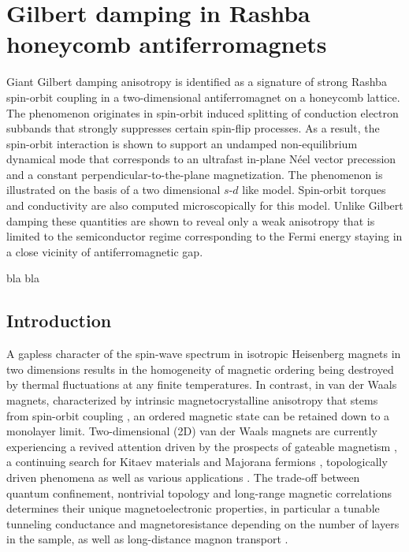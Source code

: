 \chapter{Gilbert damping in Rashba honeycomb antiferromagnets} %
Giant Gilbert damping anisotropy is identified as a signature of strong Rashba spin-orbit coupling in a two-dimensional antiferromagnet on a honeycomb lattice. The phenomenon originates in spin-orbit induced splitting of conduction electron subbands that strongly suppresses certain spin-flip processes. As a result, the spin-orbit interaction is shown to support an undamped non-equilibrium dynamical mode that corresponds to an ultrafast in-plane N\'eel vector precession and a constant perpendicular-to-the-plane magnetization. The phenomenon is illustrated on the basis of a two dimensional $s$-$d$ like model. Spin-orbit torques and conductivity are also computed microscopically for this model. Unlike Gilbert damping these quantities are shown to reveal only a weak anisotropy that is limited to the semiconductor regime corresponding to the Fermi energy staying in a close vicinity of antiferromagnetic gap.

\vfill
bla bla
\clearpage

\section{Introduction}

A gapless character of the spin-wave spectrum in isotropic Heisenberg magnets in two dimensions results in the homogeneity of magnetic ordering being destroyed by thermal fluctuations at any finite temperatures. In contrast, in van der Waals magnets, characterized by intrinsic magnetocrystalline anisotropy that stems from spin-orbit coupling \cite{Lado2017}, an ordered magnetic state can be retained down to a monolayer limit. Two-dimensional (2D) van der Waals magnets are currently experiencing a revived attention \cite{Gong2017,Herrero2017,Burch2018,Tokmachev2018,Gong2019,Novoselov2019,Cortie2019} driven by the prospects of gateable magnetism \cite{Huang2018,Shengwei2018,Wang2018,Deng2018}, a continuing search for Kitaev materials \cite{Nagler2019,Gordon2019} and Majorana fermions \cite{Livanas2019}, topologically driven phenomena \cite{Mokrousov2019} as well as various applications \cite{Herrero2017,Burch2018,Novoselov2019}. The trade-off between quantum confinement, nontrivial topology and long-range magnetic correlations determines their unique magnetoelectronic properties, in particular a tunable tunneling conductance \cite{Wang2018a} and magnetoresistance \cite{Song2018,Klein2018,Kim2018} depending on the number of layers in the sample, as well as long-distance magnon transport \cite{Xing2019}. 

